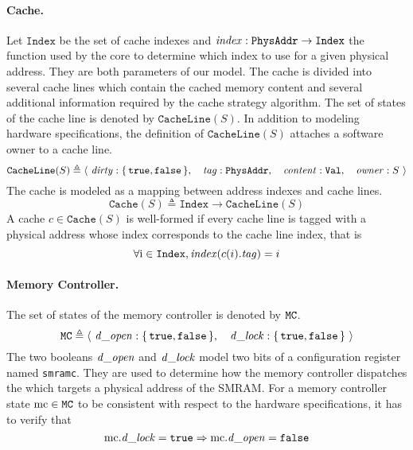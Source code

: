 \paragraph{Cache.}
%
Let $\texttt{Index}$ be the set of cache indexes and
$\mathit{index} : \texttt{PhysAddr} \rightarrow \texttt{Index}$ the function used
by the core to determine which index to use for a given physical address.
%
They are both parameters of our model.
%
The cache is divided into several cache lines which contain the cached memory
content and several additional information required by the cache strategy
algorithm.
%
The set of states of the cache line is denoted by $\texttt{CacheLine}(S)$.
%
In addition to modeling hardware specifications, the definition of
$\texttt{CacheLine}(S)$ attaches a software owner to a cache line.
%
\[
  \texttt{CacheLine}(S) \triangleq \langle~\mathit{dirty} :
  \{\,\mathtt{true}, \mathtt{false}\,\},\quad\mathit{tag} :
  \texttt{PhysAddr},\quad\mathit{content}: \texttt{Val},\quad\mathit{owner}:
  S~\rangle
\]
%
The cache is modeled as a mapping between address indexes and cache lines.
%
\[
  \texttt{Cache}(S) \triangleq \texttt{Index} \rightarrow \texttt{CacheLine}(S)
\]
%
A cache \( c \in \texttt{Cache}(S) \) is well-formed if every cache line is
tagged with a physical address whose index corresponds to the cache line index,
that is
%
\[
  \forall \mathrm{i} \in \texttt{Index}, \mathit{index}(c(i).\mathit{tag}) = i
\]

\paragraph{Memory Controller.}
%
The set of states of the memory controller is denoted by $\mathtt{MC}$.
%
\[
  \texttt{MC} \triangleq \langle~\mathit{d\_open}: \{\,\mathtt{true},
    \mathtt{false}\,\},\quad\mathit{d\_lock}: \{\,\mathtt{true},
    \mathtt{false}\,\}~\rangle
\]
%
The two booleans $\mathit{d\_open}$ and $\mathit{d\_lock}$ model two bits of a
configuration register named \texttt{smramc}.
%
They are used to determine how the memory controller dispatches the \IO which
targets a physical address of the SMRAM.
%
For a memory controller state $\mathrm{mc} \in \texttt{MC}$ to be consistent with
respect to the hardware specifications, it has to verify that
%
\[
  \mathrm{mc}.\mathit{d\_lock} = \mathtt{true} \Rightarrow \mathrm{mc}.\mathit{d\_open} =
  \mathtt{false}
\]

